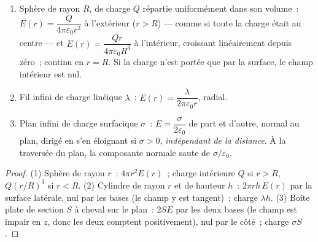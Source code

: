 \begin{proposition}\label{prop:b1:electrostatics-gauss:three}
\begin{enumerate}
  \item Sphère de rayon $R$, de charge $Q$ répartie uniformément dans son
        volume~: $E(r) = \dfrac{Q}{4\pi\varepsilon_0r^2}$ à l'extérieur ($r > R$) ---
        comme si toute la charge était au centre --- et $E(r) =
        \dfrac{Qr}{4\pi\varepsilon_0R^3}$ à l'intérieur, croissant linéairement
        depuis zéro~; continu en $r = R$. Si la charge n'est portée que par
        la surface, le champ intérieur est nul.
  \item Fil infini de charge linéique $\lambda$~: $E(r) =
        \dfrac{\lambda}{2\pi\varepsilon_0 r}$, radial.
  \item Plan infini de charge surfacique $\sigma$~: $E = \dfrac{\sigma}{2\varepsilon_0}$
        de part et d'autre, normal au plan, dirigé en s'en éloignant si
        $\sigma > 0$, \emph{indépendant de la distance}. À la traversée du
        plan, la composante normale saute de $\sigma/\varepsilon_0$.
\end{enumerate}
\end{proposition}

\begin{proof}
(1) Sphère de rayon $r$~:  $4\pi r^2E(r)$~; charge intérieure $Q$ si
$r > R$, $Q(r/R)^3$ si $r < R$. (2) Cylindre de rayon $r$ et de hauteur $h$~:
 $2\pi rh\,E(r)$ par la surface latérale, nul par les bases (le champ y
est tangent)~; charge $\lambda h$. (3) Boîte plate de section $S$ à cheval
sur le plan~:  $2SE$ par les deux bases (le champ est impair en $z$, donc
les deux comptent positivement), nul par le côté~; charge $\sigma S$.
\end{proof}

